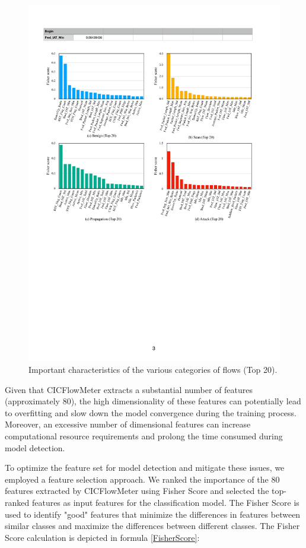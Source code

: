 \documentclass[journal]{IEEEtai}
\begin{document}
\begin{figure}[!h]
	\centering
	\includegraphics[width = 0.7\linewidth]{Figures/Important_characteristics.pdf}
	\caption{Important characteristics of the various categories of flows (Top 20).}
	\label{Important_characteristics}
\end{figure}

Given that CICFlowMeter extracts a substantial number of features (approximately 80), the high dimensionality of these features can potentially lead to overfitting and slow down the model convergence during the training process. Moreover, an excessive number of dimensional features can increase computational resource requirements and prolong the time consumed during model detection.



To optimize the feature set for model detection and mitigate these issues, we employed a feature selection approach. 
We ranked the importance of the 80 features extracted by CICFlowMeter using Fisher Score \cite{10075591} and selected the top-ranked features as input features for the classification model.
The Fisher Score is used to identify "good" features that minimize the differences in features between similar classes and maximize the differences between different classes. 
The Fisher Score calculation is depicted in formula \eqref{FisherScore}:
\end{document}
